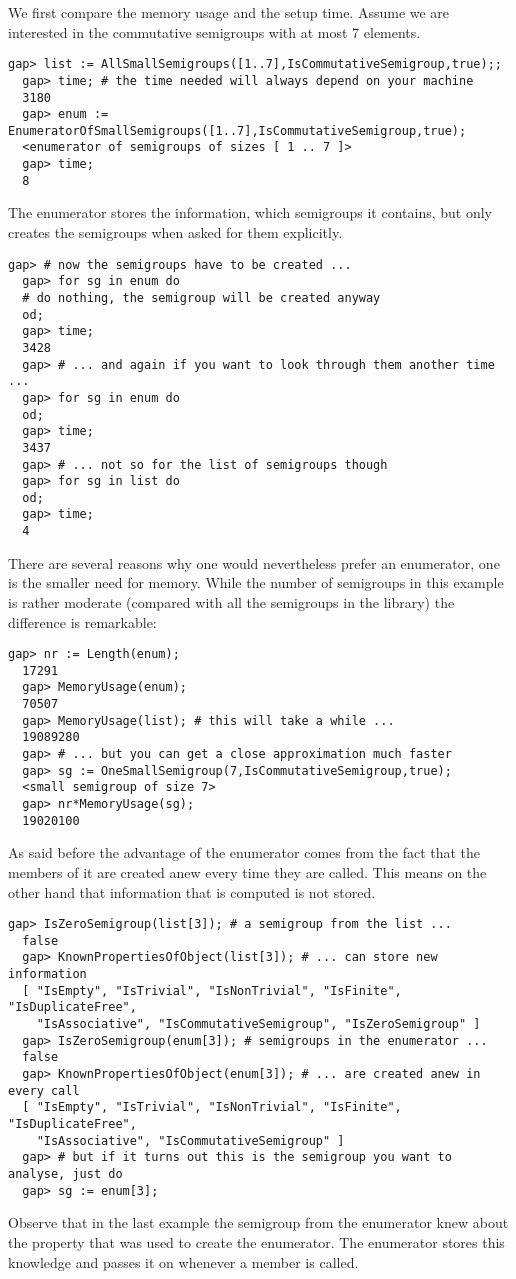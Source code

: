 \documentclass[a4paper,11pt]{report}
\begin{document}
{{{ We first compare the memory usage and the setup time. Assume we are interested
in the commutative semigroups with at most 7 elements. 
\begin{Verbatim}[fontsize=\small,frame=single,label=Example]
  gap> list := AllSmallSemigroups([1..7],IsCommutativeSemigroup,true);;
  gap> time; # the time needed will always depend on your machine
  3180
  gap> enum := EnumeratorOfSmallSemigroups([1..7],IsCommutativeSemigroup,true);
  <enumerator of semigroups of sizes [ 1 .. 7 ]>
  gap> time;
  8
\end{Verbatim}
 The enumerator stores the information, which semigroups it contains, but only
creates the semigroups when asked for them explicitly. 
\begin{Verbatim}[fontsize=\small,frame=single,label=Example]
  gap> # now the semigroups have to be created ...
  gap> for sg in enum do
  # do nothing, the semigroup will be created anyway
  od;
  gap> time;
  3428
  gap> # ... and again if you want to look through them another time ...
  gap> for sg in enum do
  od;
  gap> time;
  3437
  gap> # ... not so for the list of semigroups though
  gap> for sg in list do
  od;
  gap> time;
  4
\end{Verbatim}
 There are several reasons why one would nevertheless prefer an enumerator, one
is the smaller need for memory. While the number of semigroups in this example
is rather moderate (compared with all the semigroups in the library) the
difference is remarkable: 
\begin{Verbatim}[fontsize=\small,frame=single,label=Example]
  gap> nr := Length(enum);
  17291
  gap> MemoryUsage(enum);                                 
  70507
  gap> MemoryUsage(list); # this will take a while ...
  19089280
  gap> # ... but you can get a close approximation much faster
  gap> sg := OneSmallSemigroup(7,IsCommutativeSemigroup,true);
  <small semigroup of size 7>
  gap> nr*MemoryUsage(sg);
  19020100
\end{Verbatim}
 As said before the advantage of the enumerator comes from the fact that the
members of it are created anew every time they are called. This means on the
other hand that information that is computed is not stored. 
\begin{Verbatim}[fontsize=\small,frame=single,label=Example]
  gap> IsZeroSemigroup(list[3]); # a semigroup from the list ...
  false
  gap> KnownPropertiesOfObject(list[3]); # ... can store new information
  [ "IsEmpty", "IsTrivial", "IsNonTrivial", "IsFinite", "IsDuplicateFree", 
    "IsAssociative", "IsCommutativeSemigroup", "IsZeroSemigroup" ]
  gap> IsZeroSemigroup(enum[3]); # semigroups in the enumerator ...
  false
  gap> KnownPropertiesOfObject(enum[3]); # ... are created anew in every call 
  [ "IsEmpty", "IsTrivial", "IsNonTrivial", "IsFinite", "IsDuplicateFree", 
    "IsAssociative", "IsCommutativeSemigroup" ]
  gap> # but if it turns out this is the semigroup you want to analyse, just do
  gap> sg := enum[3];
\end{Verbatim}
 Observe that in the last example the semigroup from the enumerator knew about
the property that was used to create the enumerator. The enumerator stores
this knowledge and passes it on whenever a member is called. 

}}}
\end{document}
